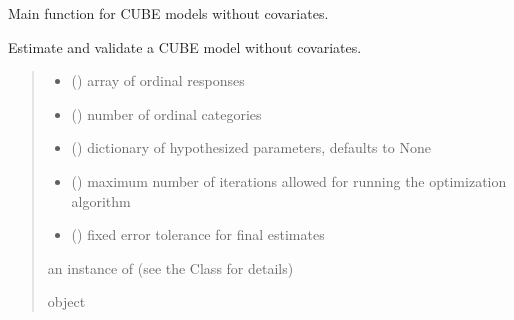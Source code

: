 \documentclass[letterpaper,10pt,english]{sphinxmanual}
\begin{document}
\begin{fulllineitems}
\label{\detokenize{cubmods:cubmods.cube.mle}}
\pysigstartsignatures
{}
\pysigstopsignatures
\sphinxAtStartPar
Main function for CUBE models without covariates.

\sphinxAtStartPar
Estimate and validate a CUBE model without covariates.
\begin{quote}\begin{description}
\begin{itemize}
\item {} 
\sphinxAtStartPar
{} () \textendash{} array of ordinal responses

\item {} 
\sphinxAtStartPar
{} () \textendash{} number of ordinal categories

\item {} 
\sphinxAtStartPar
{} (\sphinxstyleliteralemphasis{\sphinxupquote{, }}) \textendash{} dictionary of hypothesized parameters, defaults to None

\item {} 
\sphinxAtStartPar
{} () \textendash{} maximum number of iterations allowed for running the optimization algorithm

\item {} 
\sphinxAtStartPar
{} () \textendash{} fixed error tolerance for final estimates

\end{itemize}

\sphinxAtStartPar
an instance of  (see the Class for details)

\sphinxAtStartPar
object

\end{description}\end{quote}

\end{fulllineitems}
\end{document}
